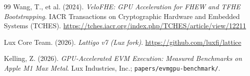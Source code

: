 \begin{thebibliography}{99}
Wang, T., et al. (2024).
\textit{VeloFHE: GPU Acceleration for FHEW and TFHE Bootstrapping}.
IACR Transactions on Cryptographic Hardware and Embedded Systems (TCHES).
\url{https://tches.iacr.org/index.php/TCHES/article/view/12211}

Lux Core Team. (2026).
\textit{Lattigo v7 (Lux fork)}.
\url{https://github.com/luxfi/lattice}

Kelling, Z. (2026).
\textit{GPU-Accelerated EVM Execution: Measured Benchmarks on Apple M1 Max Metal}.
Lux Industries, Inc.; \texttt{papers/evmgpu-benchmark/}.

\end{thebibliography}

